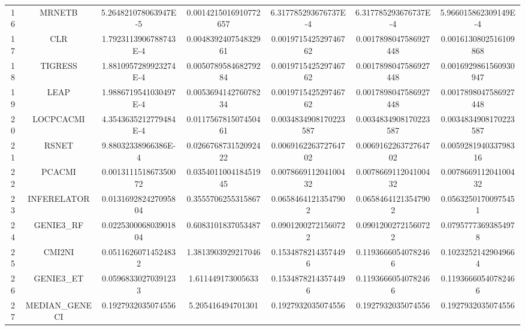 \documentclass[a4paper,10pt]{article}
\begin{document}
\begin{landscape}
\begin{table}[!htp]
\begin{tabular}{ccccccc}
16&MRNETB&5.264821078063947E-5&0.0014215016910772657&6.317785293676737E-4&6.317785293676737E-4&5.966015862309149E-4\\
17&CLR&1.7923113906788743E-4&0.004839240754832961&0.001971542529746762&0.0017898047586927448&0.0016130802516109868\\
18&TIGRESS&1.8810957289923274E-4&0.005078958468279284&0.001971542529746762&0.0017898047586927448&0.0016929861560930947\\
19&LEAP&1.9886719541030497E-4&0.005369414276078234&0.001971542529746762&0.0017898047586927448&0.0017898047586927448\\
20&LOCPCACMI&4.3543635212779484E-4&0.011756781507450461&0.0034834908170223587&0.0034834908170223587&0.0034834908170223587\\
21&RSNET&9.88032338966386E-4&0.026676873152092422&0.006916226372764702&0.006916226372764702&0.005928194033798316\\
22&PCACMI&0.001311151867350072&0.035401100418451945&0.007866911204100432&0.007866911204100432&0.007866911204100432\\
23&INFERELATOR&0.013169282427095804&0.3555706255315867&0.06584641213547902&0.06584641213547902&0.05632501700975451\\
24&GENIE3_RF&0.022530006803901804&0.6083101837053487&0.09012002721560722&0.09012002721560722&0.07957773693854978\\
25&CMI2NI&0.05116260714524832&1.3813903929217046&0.15348782143574496&0.11936660540782466&0.10232521429049664\\
26&GENIE3_ET&0.05968330270391233&1.611449173005633&0.15348782143574496&0.11936660540782466&0.11936660540782466\\
27&MEDIAN_GENECI&0.1927932035074556&5.205416494701301&0.1927932035074556&0.1927932035074556&0.1927932035074556\\
\hline
\end{tabular}
\end{table}


\end{landscape}
\end{document}
